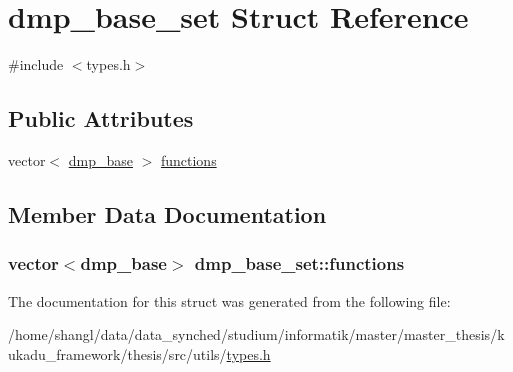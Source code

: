\hypertarget{structdmp__base__set}{\section{dmp\-\_\-base\-\_\-set \-Struct \-Reference}
\label{structdmp__base__set}
}


{\ttfamily \#include $<$types.\-h$>$}

\subsection*{\-Public \-Attributes}
\begin{DoxyCompactItemize}
\item 
vector$<$ \hyperlink{structdmp__base}{dmp\-\_\-base} $>$ \hyperlink{structdmp__base__set_a24e18bbcb302d3e261adb794640d4a01}{functions}
\end{DoxyCompactItemize}


\subsection{\-Member \-Data \-Documentation}
\hypertarget{structdmp__base__set_a24e18bbcb302d3e261adb794640d4a01}{
\subsubsection[{functions}]{\setlength{\rightskip}{0pt plus 5cm}vector$<${\bf dmp\-\_\-base}$>$ {\bf dmp\-\_\-base\-\_\-set\-::functions}}}\label{structdmp__base__set_a24e18bbcb302d3e261adb794640d4a01}


\-The documentation for this struct was generated from the following file\-:\begin{DoxyCompactItemize}
\item 
/home/shangl/data/data\-\_\-synched/studium/informatik/master/master\-\_\-thesis/kukadu\-\_\-framework/thesis/src/utils/\hyperlink{types_8h}{types.\-h}\end{DoxyCompactItemize}
